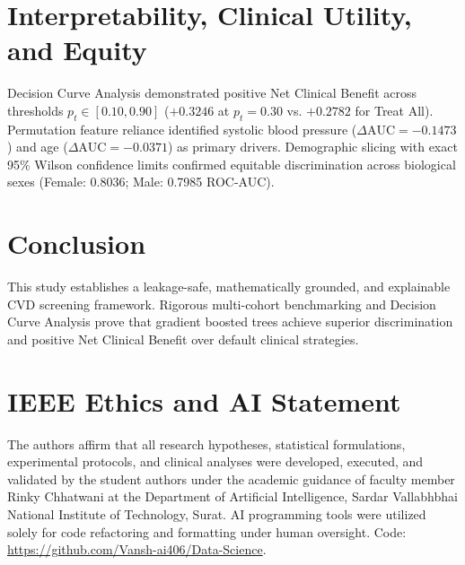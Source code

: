 \documentclass[conference]{IEEEtran}
\begin{document}
\section{Interpretability, Clinical Utility, and Equity}
Decision Curve Analysis demonstrated positive Net Clinical Benefit across thresholds $p_t \in [0.10, 0.90]$ ($+0.3246$ at $p_t = 0.30$ vs. $+0.2782$ for Treat All). Permutation feature reliance identified systolic blood pressure ($\Delta\text{AUC} = -0.1473$) and age ($\Delta\text{AUC} = -0.0371$) as primary drivers. Demographic slicing with exact 95\% Wilson confidence limits confirmed equitable discrimination across biological sexes (Female: 0.8036; Male: 0.7985 ROC-AUC).

\section{Conclusion}
This study establishes a leakage-safe, mathematically grounded, and explainable CVD screening framework. Rigorous multi-cohort benchmarking and Decision Curve Analysis prove that gradient boosted trees achieve superior discrimination and positive Net Clinical Benefit over default clinical strategies.

\section*{IEEE Ethics and AI Statement}
The authors affirm that all research hypotheses, statistical formulations, experimental protocols, and clinical analyses were developed, executed, and validated by the student authors under the academic guidance of faculty member Rinky Chhatwani at the Department of Artificial Intelligence, Sardar Vallabhbhai National Institute of Technology, Surat. AI programming tools were utilized solely for code refactoring and formatting under human oversight. Code: \url{https://github.com/Vansh-ai406/Data-Science}.



\end{document}
